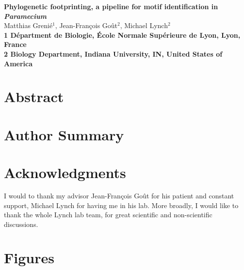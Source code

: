 \documentclass[10pt]{article}
\date{}
\begin{document}
\begin{flushleft}
{\Large
\textbf{Phylogenetic footprinting, a pipeline for motif identification in \textit{Paramecium}}
}
\\
Matthias Grenié$^{1}$, 
Jean-François Goût$^{2}$, 
Michael Lynch$^{2}$
\\
\bf{1} Départment de Biologie, École Normale Supérieure de Lyon, Lyon, France
\\
\bf{2} Biology Department, Indiana University, IN, United States of America
\\
\end{flushleft}

\section*{Abstract}

\section*{Author Summary}









\section*{Acknowledgments}

I would to thank my advisor Jean-François Goût for his patient and constant support, Michael Lynch for having me in his lab. More broadly, I would like to thank the whole Lynch lab team, for great scientific and non-scientific discussions.

\section*{Figures}
\end{document}
